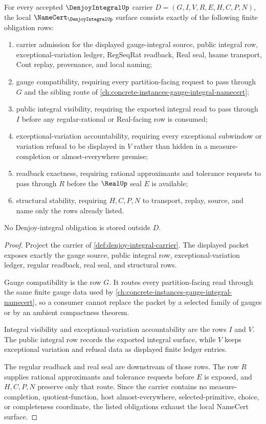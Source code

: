 
\begin{theorem}
\label{thm:denjoy-integral-namecert-obligations}
For every accepted $\DenjoyIntegralUp$ carrier $D=(G,I,V,R,E,H,C,P,N)$, the local $\NameCert_{\DenjoyIntegralUp}$ surface consists exactly of the following finite obligation rows:
\begin{enumerate}
\item carrier admission for the displayed gauge-integral source, public integral row, exceptional-variation ledger, RegSeqRat readback, Real seal, hsame transport, Cont replay, provenance, and local naming;
\item gauge compatibility, requiring every partition-facing request to pass through $G$ and the sibling route of \autoref{ch:concrete-instances-gauge-integral-namecert};
\item public integral visibility, requiring the exported integral read to pass through $I$ before any regular-rational or Real-facing row is consumed;
\item exceptional-variation accountability, requiring every exceptional subwindow or variation refusal to be displayed in $V$ rather than hidden in a measure-completion or almost-everywhere premise;
\item readback exactness, requiring rational approximants and tolerance requests to pass through $R$ before the $\RealUp$ seal $E$ is available;
\item structural stability, requiring $H,C,P,N$ to transport, replay, source, and name only the rows already listed.
\end{enumerate}
No Denjoy-integral obligation is stored outside $D$.
\end{theorem}
\begin{proof}
Project the carrier of \autoref{def:denjoy-integral-carrier}. The displayed packet exposes exactly the gauge source, public integral row, exceptional-variation ledger, regular readback, real seal, and structural rows.

Gauge compatibility is the row $G$. It routes every partition-facing read through the same finite gauge data used by \autoref{ch:concrete-instances-gauge-integral-namecert}, so a consumer cannot replace the packet by a selected family of gauges or by an ambient compactness theorem.

Integral visibility and exceptional-variation accountability are the rows $I$ and $V$. The public integral row records the exported integral surface, while $V$ keeps exceptional variation and refusal data as displayed finite ledger entries.

The regular readback and real seal are downstream of those rows. The row $R$ supplies rational approximants and tolerance requests before $E$ is exposed, and $H,C,P,N$ preserve only that route. Since the carrier contains no measure-completion, quotient-function, host almost-everywhere, selected-primitive, choice, or completeness coordinate, the listed obligations exhaust the local NameCert surface.
\end{proof}

